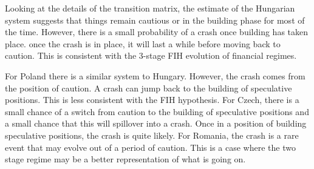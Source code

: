 \documentclass[12pt, a4paper, oneside]{article} %
\begin{document}
Looking at the details of the transition matrix, the estimate of the Hungarian system suggests that things remain cautious or in the building phase for most of the time.  However, there is a small probability of a crash once building has taken place. once the crash is in place, it will last a while before moving back to caution. This is consistent with the 3-stage FIH evolution of financial regimes. 

For Poland there is a similar system to Hungary.  However, the crash comes from the position of caution.  A crash can jump back to the building of speculative positions.  This is less consistent with the FIH hypothesis. For Czech, there is a small chance of a switch from caution to the building of speculative positions and a small chance that this will spillover into a crash. Once in a position of building speculative positions, the crash is quite likely.  For Romania, the crash is a rare event that may evolve out of a period of caution. This is a case where the two stage regime may be a better representation of what is going on. 
\end{document}

